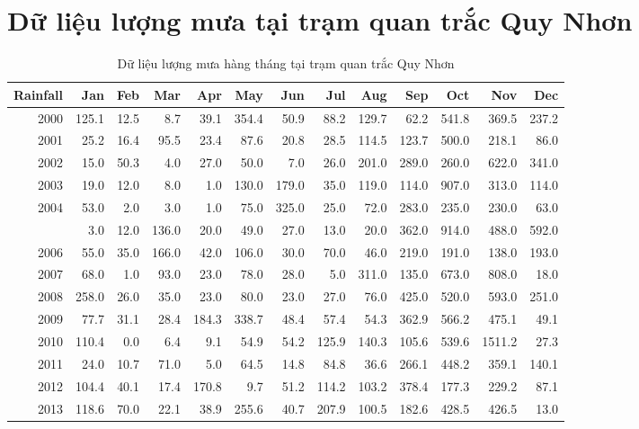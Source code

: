 \documentclass[12pt, a4paper,oneside]{book}
\theoremstyle{definition}
\begin{document}
\section{Dữ liệu lượng mưa tại trạm quan trắc Quy Nhơn}
\begin{table}[!h]	
	\caption{Dữ liệu lượng mưa hàng tháng tại trạm quan trắc Quy Nhơn}
	\label{datarainfall}
	\centering
	\fontsize{5.7}{10}\selectfont
	\begin{tabular}[t]{rrrrrrrrrrrrr}
		\toprule
		Rainfall & Jan & Feb & Mar & Apr & May & Jun & Jul & Aug & Sep & Oct & Nov & Dec\\
		\midrule
		\rowcolor{gray!6}  2000 & 125.1 & 12.5 & 8.7 & 39.1 & 354.4 & 50.9 & 88.2 & 129.7 & 62.2 & 541.8 & 369.5 & 237.2\\
		2001 & 25.2 & 16.4 & 95.5 & 23.4 & 87.6 & 20.8 & 28.5 & 114.5 & 123.7 & 500.0 & 218.1 & 86.0\\
		\rowcolor{gray!6}  2002 & 15.0 & 50.3 & 4.0 & 27.0 & 50.0 & 7.0 & 26.0 & 201.0 & 289.0 & 260.0 & 622.0 & 341.0\\
		2003 & 19.0 & 12.0 & 8.0 & 1.0 & 130.0 & 179.0 & 35.0 & 119.0 & 114.0 & 907.0 & 313.0 & 114.0\\
		\rowcolor{gray!6}  2004 & 53.0 & 2.0 & 3.0 & 1.0 & 75.0 & 325.0 & 25.0 & 72.0 & 283.0 & 235.0 & 230.0 & 63.0\\
		\addlinespace
		2005 & 3.0 & 12.0 & 136.0 & 20.0 & 49.0 & 27.0 & 13.0 & 20.0 & 362.0 & 914.0 & 488.0 & 592.0\\
		\rowcolor{gray!6}  2006 & 55.0 & 35.0 & 166.0 & 42.0 & 106.0 & 30.0 & 70.0 & 46.0 & 219.0 & 191.0 & 138.0 & 193.0\\
		2007 & 68.0 & 1.0 & 93.0 & 23.0 & 78.0 & 28.0 & 5.0 & 311.0 & 135.0 & 673.0 & 808.0 & 18.0\\
		\rowcolor{gray!6}  2008 & 258.0 & 26.0 & 35.0 & 23.0 & 80.0 & 23.0 & 27.0 & 76.0 & 425.0 & 520.0 & 593.0 & 251.0\\
		2009 & 77.7 & 31.1 & 28.4 & 184.3 & 338.7 & 48.4 & 57.4 & 54.3 & 362.9 & 566.2 & 475.1 & 49.1\\
		\addlinespace
		\rowcolor{gray!6}  2010 & 110.4 & 0.0 & 6.4 & 9.1 & 54.9 & 54.2 & 125.9 & 140.3 & 105.6 & 539.6 & 1511.2 & 27.3\\
		2011 & 24.0 & 10.7 & 71.0 & 5.0 & 64.5 & 14.8 & 84.8 & 36.6 & 266.1 & 448.2 & 359.1 & 140.1\\
		\rowcolor{gray!6}  2012 & 104.4 & 40.1 & 17.4 & 170.8 & 9.7 & 51.2 & 114.2 & 103.2 & 378.4 & 177.3 & 229.2 & 87.1\\
		2013 & 118.6 & 70.0 & 22.1 & 38.9 & 255.6 & 40.7 & 207.9 & 100.5 & 182.6 & 428.5 & 426.5 & 13.0\\

\end{tabular}
\end{table}
\end{document}
